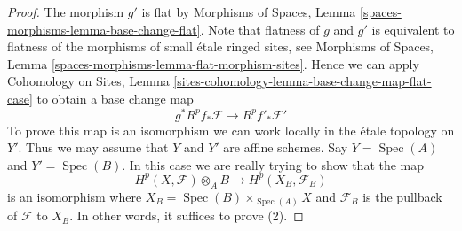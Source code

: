 \documentclass{stacks-project}
\theoremstyle{plain}
\theoremstyle{definition}
\theoremstyle{remark}
\numberwithin{equation}{subsection}
\def\Spec{\mathop{\mathrm{Spec}}}
\begin{document}
\begin{proof}
The morphism $g'$ is flat by
Morphisms of Spaces, Lemma \ref{spaces-morphisms-lemma-base-change-flat}.
Note that flatness of $g$ and $g'$ is equivalent to flatness
of the morphisms of small \'etale ringed sites, see
Morphisms of Spaces, Lemma \ref{spaces-morphisms-lemma-flat-morphism-sites}.
Hence we can apply
Cohomology on Sites, Lemma
\ref{sites-cohomology-lemma-base-change-map-flat-case}
to obtain a base change map
$$
g^*R^pf_*\mathcal{F} \longrightarrow R^pf'_*\mathcal{F}'
$$
To prove this map is an isomorphism we can work locally in the \'etale
topology on $Y'$. Thus we may assume that $Y$ and $Y'$ are affine
schemes. Say $Y = \Spec(A)$ and $Y' = \Spec(B)$.
In this case we are really trying to show that the map
$$
H^p(X, \mathcal{F}) \otimes_A B \longrightarrow H^p(X_B, \mathcal{F}_B)
$$
is an isomorphism where $X_B = \Spec(B) \times_{\Spec(A)} X$ and
$\mathcal{F}_B$ is the pullback of $\mathcal{F}$ to $X_B$.
In other words, it suffices to prove (2).


\end{proof}
\end{document}
